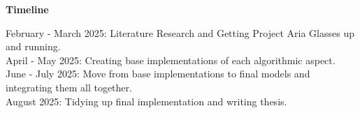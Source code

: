 \documentclass[11pt]{article}
\newcommand{\sect}[1]{\begin{center}\textbf{#1}\end{center}}
\begin{document}
\sect{Timeline}

February - March 2025: Literature Research and Getting Project Aria Glasses up and running. \\

April - May 2025: Creating base implementations of each algorithmic aspect.  \\

June - July 2025: Move from base implementations to final models and integrating them all together.  \\

August 2025: Tidying up final implementation and writing thesis. \\







\renewcommand{\refname}{{\normalsize \sect{References}}}




\end{document}
